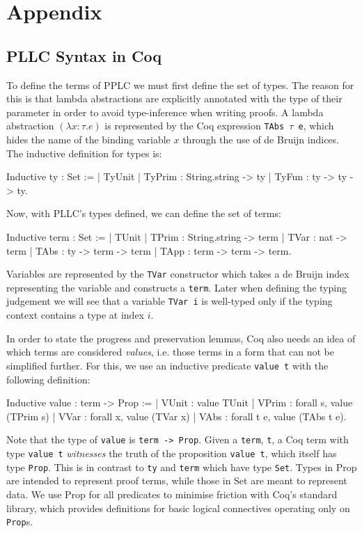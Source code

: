 \documentclass[]{unswthesis}
\let\c\texttt
\let\i\textit
\begin{document}
\chapter{Appendix}

\section{PLLC Syntax in Coq}
\label{app:pllc-syntax}

To define the terms of PPLC we must first define the set of types. The reason for this is that lambda abstractions are explicitly annotated with the type of their parameter in order to avoid type-inference when writing proofs. A lambda abstraction $(\lambda x : \tau. e)$ is represented by the Coq expression \c{TAbs $\tau$ e}, which hides the name of the binding variable $x$ through the use of de Bruijn indices. The inductive definition for types is:

\begin{coqcode}
Inductive ty : Set :=
  | TyUnit
  | TyPrim : String.string -> ty
  | TyFun : ty -> ty -> ty.
\end{coqcode}

Now, with PLLC's types defined, we can define the set of terms:

\begin{coqcode}
Inductive term : Set :=
  | TUnit
  | TPrim : String.string -> term
  | TVar : nat -> term
  | TAbs : ty -> term -> term
  | TApp : term -> term -> term.
\end{coqcode}

Variables are represented by the \c{TVar} constructor which takes a de Bruijn index representing the variable and constructs a \c{term}. Later when defining the typing judgement we will see that a variable \c{TVar i} is well-typed only if the typing context contains a type at index $i$.

In order to state the progress and preservation lemmas, Coq also needs an idea of which terms are considered \i{values}, i.e. those terms in a form that can not be simplified further. For this, we use an inductive predicate \c{value t} with the following definition:

\begin{coqcode}
Inductive value : term -> Prop :=
  | VUnit : value TUnit
  | VPrim : forall s, value (TPrim s)
  | VVar : forall x, value (TVar x)
  | VAbs : forall t e, value (TAbs t e).
\end{coqcode}

Note that the type of \c{value} is \c{term -> Prop}. Given a \c{term}, \c{t}, a Coq term with type \c{value t} \i{witnesses} the truth of the proposition \c{value t}, which itself has type \c{Prop}. This is in contrast to \c{ty} and \c{term} which have type \c{Set}. Types in Prop are intended to represent proof terms, while those in Set are meant to represent data. We use Prop for all predicates to minimise friction with Coq's standard library, which provides definitions for basic logical connectives operating only on \c{Prop}s.
\end{document}
